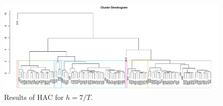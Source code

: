 \documentclass[a4paper,12pt]{article}
\numberwithin{equation}{section}
\begin{document}
\newpage 
\FloatBarrier
\begin{figure}
\includegraphics[width=\textwidth]{plots/7days/dendrogram}
\caption{Results of HAC for $h = 7/T$.}\label{fig:dend}
\end{figure}
\end{document}

